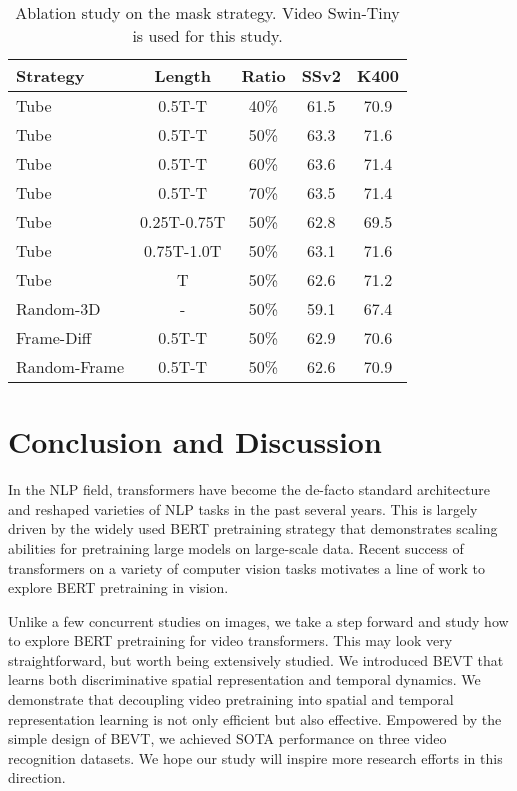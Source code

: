 \documentclass[10pt,twocolumn,letterpaper]{article}
\newcommand{\ra}[1]{\renewcommand{\arraystretch}{#1}}
\begin{document}
\begin{table}[t]
  \centering
 \ra{1.0}
    \setlength{\tabcolsep}{0pt} \begin{tabular*}{\linewidth}{@{\extracolsep{\fill}}lcccc@{}}
    \toprule
    Strategy & Length & Ratio & SSv2 & K400 \\
    \midrule
    Tube & 0.5T-T & 40\% & 61.5 & 70.9 \\
    Tube & 0.5T-T & 50\% & 63.3 & 71.6 \\
    Tube & 0.5T-T & 60\% & 63.6 & 71.4 \\
    Tube & 0.5T-T & 70\% & 63.5 & 71.4 \\
    \midrule
    Tube & 0.25T-0.75T & 50\% & 62.8 & 69.5 \\
    Tube & 0.75T-1.0T & 50\% & 63.1 & 71.6 \\
    Tube & T & 50\% & 62.6 & 71.2 \\
    \midrule
    Random-3D & - & 50\% & 59.1 & 67.4 \\
Frame-Diff & 0.5T-T & 50\% & 62.9 & 70.6 \\
    Random-Frame & 0.5T-T & 50\% & 62.6 & 70.9 \\
\bottomrule
  \end{tabular*}
  \caption{Ablation study on the mask strategy. Video Swin-Tiny is used for this study.}
  \label{tab:mask_ablation}
  \vspace{-1em}
\end{table}

\section{Conclusion and Discussion}
In the NLP field, transformers have become the de-facto standard architecture and reshaped varieties of NLP tasks in the past several years. This is largely driven by the widely used BERT pretraining strategy that demonstrates scaling abilities for pretraining large models on large-scale data. Recent success of transformers on a variety of computer vision tasks motivates a line of work to explore BERT pretraining in vision.

Unlike a few concurrent studies on images, we take a step forward and study how to explore BERT pretraining for video transformers. This may look very straightforward, but worth being extensively studied. We introduced BEVT that learns both discriminative spatial representation and temporal dynamics. We demonstrate that decoupling video pretraining into spatial and temporal representation learning is not only efficient but also effective. Empowered by the simple design of BEVT, we achieved SOTA performance on three video recognition datasets. We hope our study will inspire more research efforts in this direction.
\end{document}
